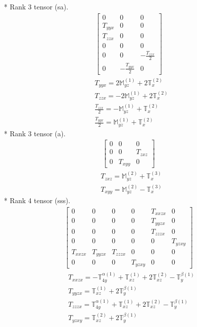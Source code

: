 \documentclass[fleqn,8pt,landscape]{jsarticle}
\begin{document}
* Rank 3 tensor (sa).
\begin{align*}
\begin{bmatrix} 0 & 0 & 0 \\ T_{yyx} & 0 & 0 \\ T_{zzx} & 0 & 0 \\ 0 & 0 & 0 \\ 0 & 0 & - \frac{T_{zzx}}{2} \\ 0 & - \frac{T_{yyx}}{2} & 0 \end{bmatrix}
\end{align*}
\begin{align*}
& T_{yyx} = 2 \mathbb{M}_{yz}^{(1)} + 2 \mathbb{T}_{x}^{(2)} \\
& T_{zzx} = - 2 \mathbb{M}_{yz}^{(1)} + 2 \mathbb{T}_{x}^{(2)} \\
& \frac{T_{zzx}}{2} = - \mathbb{M}_{yz}^{(1)} + \mathbb{T}_{x}^{(2)} \\
& \frac{T_{yyx}}{2} = \mathbb{M}_{yz}^{(1)} + \mathbb{T}_{x}^{(2)}
\end{align*}
* Rank 3 tensor (a).
\begin{align*}
\begin{bmatrix} 0 & 0 & 0 \\ 0 & 0 & T_{zxz} \\ 0 & T_{xyy} & 0 \end{bmatrix}
\end{align*}
\begin{align*}
& T_{zxz} = \mathbb{M}_{yz}^{(2)} + \mathbb{T}_{x}^{(3)} \\
& T_{xyy} = \mathbb{M}_{yz}^{(2)} - \mathbb{T}_{x}^{(3)}
\end{align*}
* Rank 4 tensor (sss).
\begin{align*}
\begin{bmatrix} 0 & 0 & 0 & 0 & T_{xxzx} & 0 \\ 0 & 0 & 0 & 0 & T_{yyzx} & 0 \\ 0 & 0 & 0 & 0 & T_{zzzx} & 0 \\ 0 & 0 & 0 & 0 & 0 & T_{yzxy} \\ T_{xxzx} & T_{yyzx} & T_{zzzx} & 0 & 0 & 0 \\ 0 & 0 & 0 & T_{yzxy} & 0 & 0 \end{bmatrix}
\end{align*}
\begin{align*}
& T_{xxzx} = - \mathbb{T}_{4y}^{\alpha(1)} + \mathbb{T}_{xz}^{(1)} + 2 \mathbb{T}_{xz}^{(2)} - \mathbb{T}_{y}^{\beta(1)} \\
& T_{yyzx} = \mathbb{T}_{xz}^{(1)} + 2 \mathbb{T}_{y}^{\beta(1)} \\
& T_{zzzx} = \mathbb{T}_{4y}^{\alpha(1)} + \mathbb{T}_{xz}^{(1)} + 2 \mathbb{T}_{xz}^{(2)} - \mathbb{T}_{y}^{\beta(1)} \\
& T_{yzxy} = \mathbb{T}_{xz}^{(2)} + 2 \mathbb{T}_{y}^{\beta(1)}
\end{align*}
\end{document}
